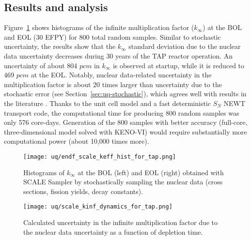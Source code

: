 \subsection{Results and analysis}
Figure~\ref{fig:uq-scale-kinf-hist} shows histograms of the 
infinite multiplication factor ($k_{\infty}$) at the \gls{BOL} and \gls{EOL} 
(30 \gls{EFPY}) for 800 total random samples. Similar to stochastic 
uncertainty, the results show that the $k_{\infty}$ standard deviation due to 
the nuclear data uncertainty decreases during 30 years of the \gls{TAP} 
reactor operation. An uncertainty of about 804 $pcm$ in $k_{\infty}$ is 
observed at startup, while it is reduced to 469 $pcm$ at the \gls{EOL}. 
Notably, nuclear data-related uncertainty in the multiplication factor is 
about 20 times larger than uncertainty due to the stochastic error (see 
Section~\ref{sec:uq-stochastic}), which agrees well with results in the 
literature \cite{takeda_estimation_1999, garcia-herranz_propagation_2008}. 
Thanks to the unit cell model and a fast deterministic $S_N$ NEWT transport 
code, the computational time for producing 800 random samples was only 576 
core-days. Generation of the 800 samples with better accuracy (full-core, 
three-dimensional model solved with KENO-VI) would require substantially more 
computational power (about 10,000 times more).
\begin{figure}[htp!] %
	\centering
	\texttt{[image: uq/endf\_scale\_keff\_hist\_for\_tap.png]}
		\vspace{-8mm}
	\caption{Histograms of $k_{\infty}$ at the \gls{BOL} (left) and 
		\gls{EOL} (right) obtained with SCALE Sampler by stochastically 
		sampling the nuclear data (cross sections, fission yields, decay 
		constants).}
	\label{fig:uq-scale-kinf-hist}
\end{figure}
\begin{figure}[hbp!] %
	\centering
	\texttt{[image: uq/scale\_kinf\_dynamics\_for\_tap.png]}
	\caption{Calculated uncertainty in the infinite multiplication factor due 
		to the nuclear data uncertainty as a function of depletion time.}
	\label{fig:uq-scale-kinf}
\end{figure}

